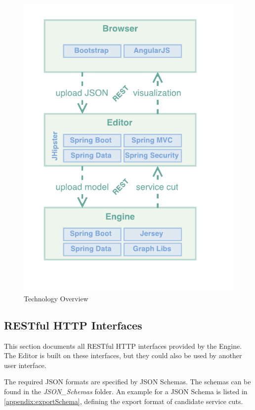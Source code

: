 \begin{minipage}[t]{0.5\textwidth}
	\begin{figure}[H]
		\includegraphics[scale=1]{diagrams/Technologies.pdf}
		\caption{Technology Overview}
		\label{fig:technologies}
	\end{figure}
\end{minipage}

\subsection{RESTful HTTP Interfaces}
\label{subsec:restApis}

This section documents all RESTful HTTP interfaces provided by the Engine. The Editor is built on these interfaces, but they could also be used by another user interface.

The required \gls{JSON} formats are specified by \gls{JSON} Schemas\cite{jsonSchema}. The schemas can be found in the \textit{JSON\_Schemas} folder. An example for a \gls{JSON} Schema is listed in \ref{appendix:exportSchema}, defining the export format of candidate service cuts. 

